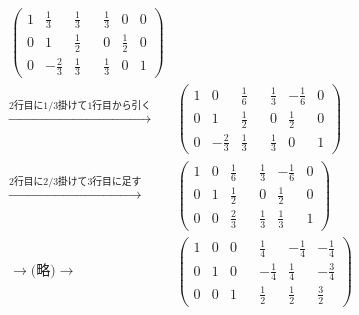 \documentclass[12pt,b5paper]{ltjsarticle}
\begin{document}
\begin{enumerate}
\begin{enumerate}
\begin{align}
\begin{pmatrix}
              1 & \frac{1}{3} & \frac{1}{3} & & \frac{1}{3} & 0 & 0\\
              0& 1 & \frac{1}{2} & & 0& \frac{1}{2} & 0\\
              0& -\frac{2}{3}& \frac{1}{3}& & \frac{1}{3}& 0& 1
             \end{pmatrix}\\
             \stackrel{\text{2行目に1/3掛けて1行目から引く}}{\longrightarrow}&
             \begin{pmatrix}
              1 & 0 & \frac{1}{6} & & \frac{1}{3} & - \frac{1}{6} & 0\\
              0& 1 & \frac{1}{2} & & 0& \frac{1}{2} & 0\\
              0& -\frac{2}{3}& \frac{1}{3}& & \frac{1}{3}& 0& 1
             \end{pmatrix}\\
             \stackrel{\text{2行目に2/3掛けて3行目に足す}}{\longrightarrow}&
             \begin{pmatrix}
              1 & 0 & \frac{1}{6} & & \frac{1}{3} & - \frac{1}{6} & 0\\
              0& 1 & \frac{1}{2} & & 0& \frac{1}{2} & 0\\
              0& 0 & \frac{2}{3}& & \frac{1}{3} & \frac{1}{3}& 1
             \end{pmatrix}\\
             \rightarrow \text{(略)} \rightarrow &
             \begin{pmatrix}
              1&0&0& & \frac{1}{4} & - \frac{1}{4} & - \frac{1}{4}\\
              0&1&0& & - \frac{1}{4}& \frac{1}{4} & - \frac{3}{4}\\
              0&0&1& & \frac{1}{2} & \frac{1}{2}& \frac{3}{2}
             \end{pmatrix}
            \end{align}


\end{enumerate}
\end{enumerate}
\end{document}
